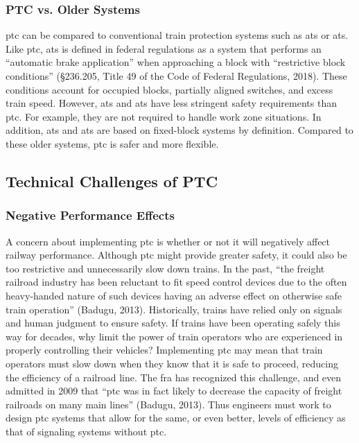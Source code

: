 \documentclass[11pt, titlepage]{article}
\begin{document}
\subsubsection{PTC vs. Older Systems}

\gls{ptc} can be compared to conventional train protection systems such as
\gls{ats} or \gls{ats}. Like \gls{ptc}, \gls{ats} is defined in federal regulations
as a system that performs an ``automatic brake application'' when approaching a
block with ``restrictive block conditions'' (§236.205, Title 49 of the Code of
Federal Regulations, 2018). These conditions account for occupied blocks, partially
aligned switches, and excess train speed. However, \gls{ats} and \gls{ats} have
less stringent safety requirements than \gls{ptc}. For example, they are not
required to handle work zone situations. In addition, \gls{ats} and \gls{ats} are
based on fixed-block systems by definition. Compared to these older systems,
\gls{ptc} is safer and more flexible.

\subsection{Technical Challenges of PTC}

\subsubsection{Negative Performance Effects}

A concern about implementing \gls{ptc} is whether or not it will negatively affect
railway performance. Although \gls{ptc} might provide greater safety, it could also
be too restrictive and unnecessarily slow down trains. In the past, ``the freight
railroad industry has been reluctant to fit speed control devices due to the often
heavy-handed nature of such devices having an adverse effect on otherwise safe
train operation'' (Badugu, 2013). Historically, trains have relied only on signals
and human judgment to ensure safety. If trains have been operating safely this way
for decades, why limit the power of train operators who are experienced in properly
controlling their vehicles? Implementing \gls{ptc} may mean that train operators
must slow down when they know that it is safe to proceed, reducing the efficiency
of a railroad line. The \gls{fra} has recognized this challenge, and even admitted
in 2009 that “\gls{ptc} was in fact likely to decrease the capacity of freight
railroads on many main lines” (Badugu, 2013). Thus engineers must work to design
\gls{ptc} systems that allow for the same, or even better, levels of efficiency as
that of signaling systems without \gls{ptc}.
\end{document}
